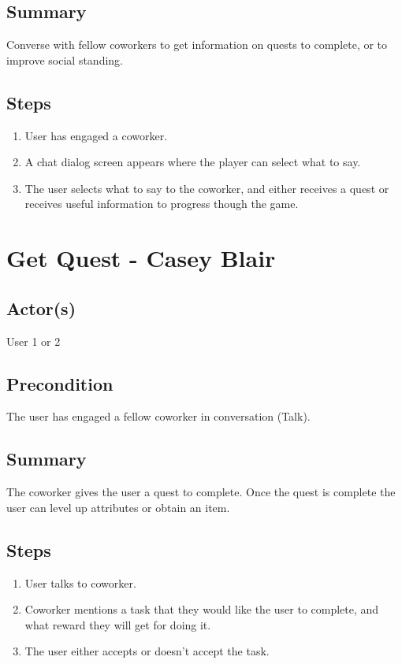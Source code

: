 \documentclass[11pt]{article}
\begin{document}
		\subsection{Summary}
				Converse with fellow coworkers to get information on quests to complete, or to improve social standing.
				\subsection{Steps}
			\begin{enumerate}
			\item User has engaged a coworker.
			\item A chat dialog screen appears where the player can select what to say.
			\item The user selects what to say to the coworker, and either receives a quest or receives useful information to progress though the game.
			
			\end{enumerate}

		
\section{Get Quest - Casey Blair}
	

		\subsection{Actor(s)}
			User 1 or 2
			

		\subsection{Precondition}
				The user has engaged a fellow coworker in conversation (Talk).
	
		\subsection{Summary}
				The coworker gives the user a quest to complete. Once the quest is complete the user can level up attributes or obtain an item.
			\subsection{Steps}
			\begin{enumerate}
			\item User talks to coworker.
			\item Coworker mentions a task that they would like the user to complete, and what reward         they 			will get for doing it.
			\item The user either accepts or doesn't accept the task.
			
			\end{enumerate}
\end{document}

